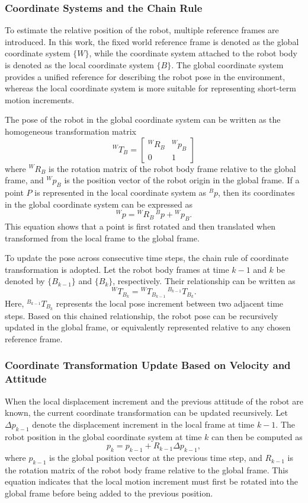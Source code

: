 \documentclass[12pt]{interim_report}
\begin{document}
\subsubsection{Coordinate Systems and the Chain Rule}

To estimate the relative position of the robot, multiple reference frames are introduced. In this work, the fixed world reference frame is denoted as the global coordinate system \( \{W\} \), while the coordinate system attached to the robot body is denoted as the local coordinate system \( \{B\} \). The global coordinate system provides a unified reference for describing the robot pose in the environment, whereas the local coordinate system is more suitable for representing short-term motion increments.

The pose of the robot in the global coordinate system can be written as the homogeneous transformation matrix
\[
{}^{W}T_{B}=
\begin{bmatrix}
{}^{W}R_{B} & {}^{W}p_{B} \\
0 & 1
\end{bmatrix}
\]
where \({}^{W}R_{B}\) is the rotation matrix of the robot body frame relative to the global frame, and \({}^{W}p_{B}\) is the position vector of the robot origin in the global frame. If a point \(P\) is represented in the local coordinate system as \({}^{B}p\), then its coordinates in the global coordinate system can be expressed as
\[
{}^{W}p = {}^{W}R_{B}\,{}^{B}p + {}^{W}p_{B}.
\]
This equation shows that a point is first rotated and then translated when transformed from the local frame to the global frame.

To update the pose across consecutive time steps, the chain rule of coordinate transformation is adopted. Let the robot body frames at time \(k-1\) and \(k\) be denoted by \( \{B_{k-1}\} \) and \( \{B_k\} \), respectively. Their relationship can be written as
\[
{}^{W}T_{B_k} = {}^{W}T_{B_{k-1}}\,{}^{B_{k-1}}T_{B_k}.
\]
Here, \({}^{B_{k-1}}T_{B_k}\) represents the local pose increment between two adjacent time steps. Based on this chained relationship, the robot pose can be recursively updated in the global frame, or equivalently represented relative to any chosen reference frame.

\subsubsection{Coordinate Transformation Update Based on Velocity and Attitude}

When the local displacement increment and the previous attitude of the robot are known, the current coordinate transformation can be updated recursively. Let \(\Delta p_{k-1}\) denote the displacement increment in the local frame at time \(k-1\). The robot position in the global coordinate system at time \(k\) can then be computed as
\[
p_k = p_{k-1} + R_{k-1}\Delta p_{k-1},
\]
where \(p_{k-1}\) is the global position vector at the previous time step, and \(R_{k-1}\) is the rotation matrix of the robot body frame relative to the global frame. This equation indicates that the local motion increment must first be rotated into the global frame before being added to the previous position.
\end{document}
